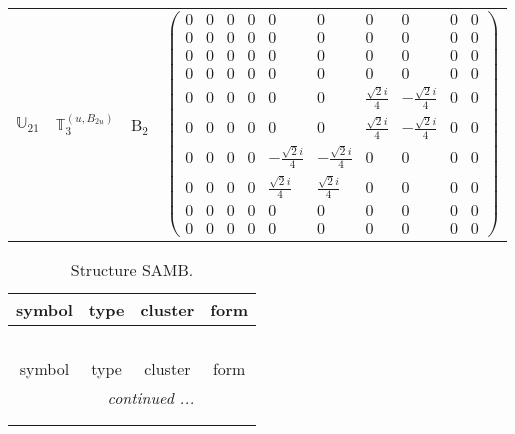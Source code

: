\documentclass[fleqn,10pt,landscape]{article}
\begin{document}
\begin{itemize}
\begin{center}
\begin{longtable}{c|c|c|c}
$ \mathbb{U}_{21} $ & $\mathbb{T}_{3}^{(u,B_{2u})}$ & B$_{2}$ & $\begin{pmatrix} 0 & 0 & 0 & 0 & 0 & 0 & 0 & 0 & 0 & 0 \\ 0 & 0 & 0 & 0 & 0 & 0 & 0 & 0 & 0 & 0 \\ 0 & 0 & 0 & 0 & 0 & 0 & 0 & 0 & 0 & 0 \\ 0 & 0 & 0 & 0 & 0 & 0 & 0 & 0 & 0 & 0 \\ 0 & 0 & 0 & 0 & 0 & 0 & \frac{\sqrt{2} i}{4} & - \frac{\sqrt{2} i}{4} & 0 & 0 \\ 0 & 0 & 0 & 0 & 0 & 0 & \frac{\sqrt{2} i}{4} & - \frac{\sqrt{2} i}{4} & 0 & 0 \\ 0 & 0 & 0 & 0 & - \frac{\sqrt{2} i}{4} & - \frac{\sqrt{2} i}{4} & 0 & 0 & 0 & 0 \\ 0 & 0 & 0 & 0 & \frac{\sqrt{2} i}{4} & \frac{\sqrt{2} i}{4} & 0 & 0 & 0 & 0 \\ 0 & 0 & 0 & 0 & 0 & 0 & 0 & 0 & 0 & 0 \\ 0 & 0 & 0 & 0 & 0 & 0 & 0 & 0 & 0 & 0 \end{pmatrix}$ \\
\end{longtable}
\end{center}
\begin{center}
\renewcommand{\arraystretch}{1.3}
\begin{longtable}{c|c|c|c}
\caption{Structure SAMB.}
 \\
 \hline \hline
symbol & type & cluster & form \\ \hline \endfirsthead

\multicolumn{3}{l}{\tablename\ \thetable{}} \\
 \hline \hline
symbol & type & cluster & form \\ \hline \endhead

 \hline \hline
\multicolumn{3}{r}{\footnotesize\it continued ...} \\ \endfoot

 \hline \hline
\multicolumn{3}{r}{} \\ \endlastfoot


\end{longtable}
\end{center}
\end{itemize}
\end{document}
